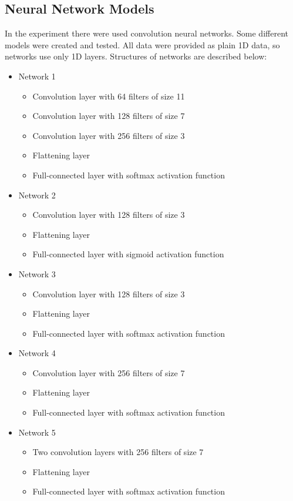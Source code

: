 \documentclass[10pt,journal,compsoc]{IEEEtran}
\begin{document}
\subsection{Neural Network Models}
In the experiment there were used convolution neural networks. Some different models were created and tested. All data were provided as plain 1D data, so networks use only 1D layers. Structures of networks are described below:
\begin{itemize}
\item{Network 1}
\begin{itemize}
\item{Convolution layer with 64 filters of size 11}
\item{Convolution layer with 128 filters of size 7}
\item{Convolution layer with 256 filters of size 3}
\item{Flattening layer}
\item{Full-connected layer with softmax activation function}
\end{itemize}
\item{Network 2}
\begin{itemize}
\item{Convolution layer with 128 filters of size 3}
\item{Flattening layer}
\item{Full-connected layer with sigmoid activation function}
\end{itemize}
\item{Network 3}
\begin{itemize}
\item{Convolution layer with 128 filters of size 3}
\item{Flattening layer}
\item{Full-connected layer with softmax activation function}
\end{itemize}
\item{Network 4}
\begin{itemize}
\item{Convolution layer with 256 filters of size 7}
\item{Flattening layer}
\item{Full-connected layer with softmax activation function}
\end{itemize}
\item{Network 5}
\begin{itemize}
\item{Two convolution layers with 256 filters of size 7}
\item{Flattening layer}
\item{Full-connected layer with softmax activation function}
\end{itemize}
\end{itemize}
\end{document}
